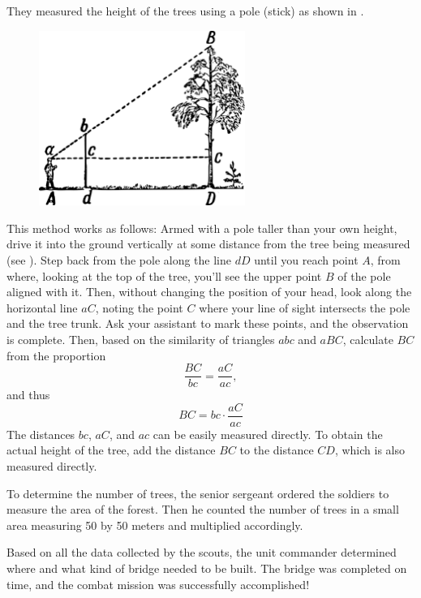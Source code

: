They measured the height of the trees using a pole (stick) as shown in .

\begin{figure}[h!]
\centering
\includegraphics[width=0.6\textwidth]{figures/ch-01/fig-01-08.pdf}
\end{figure}

This method works as follows: Armed with a pole taller than your own height, drive it into the ground vertically at some distance from the tree being measured (see ). Step back from the pole along the line $dD$ until you reach point $A$, from where, looking at the top of the tree, you'll see the upper point $B$ of the pole aligned with it. Then, without changing the position of your head, look along the horizontal line $aC$, noting the point $C$ where your line of sight intersects the pole and the tree trunk. Ask your assistant to mark these points, and the observation is complete. Then, based on the similarity of triangles $abc$ and $aBC$, calculate $BC$ from the proportion 
\begin{equation*}%
\frac{BC}{bc} = \frac{aC}{ac},
\end{equation*}
and thus
\begin{equation*}%
BC = bc \cdot \frac{aC}{ac}
\end{equation*}
The distances $bc$, $aC$, and $ac$ can be easily measured directly. To obtain the actual height of the tree, add the distance $BC$ to the distance $CD$, which is also measured directly.

To determine the number of trees, the senior sergeant ordered the soldiers to measure the area of the forest. Then he counted the number of trees in a small area measuring 50 by 50 meters and multiplied accordingly.

Based on all the data collected by the scouts, the unit commander determined where and what kind of bridge needed to be built. The bridge was completed on time, and the combat mission was successfully accomplished!



